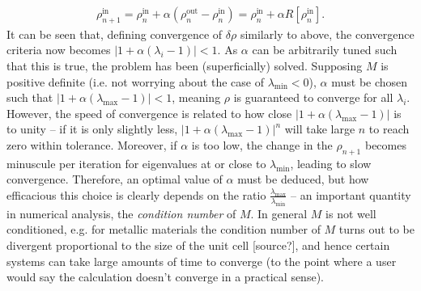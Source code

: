 \begin{gather}
\rho^{\text{in}}_{n+1} =  \rho^{\text{in}}_{n} + \alpha ( \rho^{\text{out}}_{n} -  \rho^{\text{in}}_{n} ) =  \rho^{\text{in}}_{n} + \alpha R[\rho^{\text{in}}_{n}].
\end{gather}
It can be seen that, defining convergence of $\delta \rho$ similarly to above, the convergence criteria now becomes $|1+\alpha (\lambda_i - 1)|<1$. As $\alpha$ can be arbitrarily tuned such that this is true, the problem has been (superficially) solved. Supposing $M$ is positive definite (i.e. not worrying about the case of $\lambda_{\text{min}}<0$), $\alpha$ must be chosen such that $|1+\alpha(\lambda_{\text{max}} - 1)| < 1$, meaning $\rho$ is guaranteed to converge for all $\lambda_i$. However, the speed of convergence is related to how close $|1+\alpha(\lambda_{\text{max}} - 1)|$ is to unity -- if it is only slightly less, $|1+\alpha(\lambda_{\text{max}} - 1)|^n$ will take large $n$ to reach zero within tolerance. Moreover, if $\alpha$ is too low, the change in the $\rho_{n+1}$ becomes minuscule per iteration for eigenvalues at or close to $\lambda_{\text{min}}$, leading to slow convergence. Therefore, an optimal value of $\alpha$ must be deduced, but how efficacious this choice is clearly depends on the ratio $\frac{\lambda_{\text{max}}}{\lambda_{\text{min}}}$ -- an important quantity in numerical analysis, the \textit{condition number} of $M$. In general $M$ is not well conditioned, e.g. for metallic materials the condition number of $M$ turns out to be divergent proportional to the size of the unit cell [source?], and hence certain systems can take large amounts of time to converge (to the point where a user would say the calculation doesn't converge in a practical sense).

